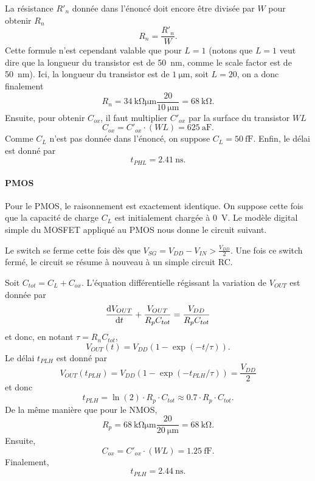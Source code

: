 \documentclass[frenchb,DIV=14]{scrartcl}
\begin{document}
La résistance $R'_n$ donnée dans l'énoncé doit encore être divisée par $W$ pour
obtenir $R_n$
\[ R_n = \frac{R'_n}{W}. \]
Cette formule n'est cependant valable que pour $L=1$ (notons que $L=1$ veut
dire que la longueur du transistor est de \SI{50}{\nano\meter}, comme le
scale factor est de \SI{50}{\nano\meter}). Ici, la longueur du transistor
est de $\SI{1}{\micro\meter}$, soit $L=20$, on a donc finalement
\[ R_n = \SI{34}{\kilo\ohm\micro\meter}\frac{20}{\SI{10}{\micro\meter}} =
\SI{68}{\kilo\ohm}. \]
Ensuite, pour obtenir $C_{ox}$, il faut multiplier $C'_{ox}$ par la surface du
transistor $WL$
\[ C_{ox} = C'_{ox}\cdot(WL) = \SI{625}{\atto\farad}. \]
Comme $C_L$ n'est pas donnée dans l'énoncé, on suppose $C_L = \SI{50}{\femto\farad}$.
Enfin, le délai est donné par
\[ t_{PHL} = \SI{2.41}{\nano\second}. \]

\paragraph{PMOS}
Pour le PMOS, le raisonnement est exactement identique. On suppose cette fois que la
capacité de charge $C_L$ est initialement chargée à \SI{0}{\volt}. Le modèle digital
simple du MOSFET appliqué au PMOS nous donne le circuit suivant.

\begin{center}
\end{center}

Le switch se ferme cette fois dès que $V_{SG} = V_{DD} - V_{IN} > \frac{V_{DD}}{2}$.
Une fois ce switch fermé, le circuit se résume à nouveau à un simple circuit RC.

\begin{center}
\end{center}

Soit $C_{tot} = C_L + C_{ox}$. L'équation différentielle régissant la variation
de $V_{OUT}$ est donnée par
\[ \frac{\operatorname{d}\! V_{OUT}}{\operatorname{d}\! t} + \frac{V_{OUT}}{R_pC_{tot}} = \frac{V_{DD}}{R_pC_{tot}} \]
et donc, en notant $\tau = R_nC_{tot}$,
\[ V_{OUT}(t) = V_{DD}\left(1 - \exp\left(-t/\tau\right)\right). \]
Le délai $t_{PLH}$ est donné par
\[ V_{OUT}(t_{PLH}) = V_{DD}\left(1 - \exp\left(-t_{PLH}/\tau\right)\right) = \frac{V_{DD}}{2} \]
et donc
\[ t_{PLH} = \ln(2)\cdot R_p\cdot C_{tot} \approx 0.7\cdot R_p\cdot C_{tot}. \]
De la même manière que pour le NMOS,
\[ R_p = \SI{68}{\kilo\ohm\micro\meter}\frac{20}{\SI{20}{\micro\meter}} =
\SI{68}{\kilo\ohm}. \]
Ensuite,
\[ C_{ox} = C'_{ox}\cdot(WL) = \SI{1.25}{\femto\farad}. \]
Finalement,
\[ t_{PLH} = \SI{2.44}{\nano\second}. \]
\end{document}
